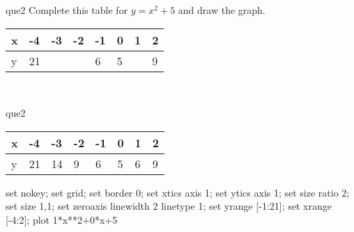 \documentclass[13.5pt, varwidth=true]{beamer}
\begin{document}
\begin{frame}[shrink=19,fragile]
	\begin{beamercolorbox}[rounded=true, left, shadow=true,wd=14.8cm]{que2}
		 Complete this table for $y = x^{2} + 5$ and draw the graph. \\[0.3cm] \renewcommand{\arraystretch}{1.2}\begin{tabular}{|C|C|C|C|C|C|C|C|} \hline x & -4 & -3 & -2 & -1 & 0 & 1 & 2 \\ \hline y & 21 &  &  & 6 & 5 &  & 9\\ \hline \end{tabular}\\[0.3cm]
	\end{beamercolorbox}
\end{frame}
\begin{frame}[shrink=19,fragile]
	\begin{beamercolorbox}[rounded=true, left, shadow=true,wd=14.8cm]{que2}
		\renewcommand{\arraystretch}{1.2}\begin{tabular}{|C|C|C|C|C|C|C|C|} \hline x & -4 & -3 & -2 & -1 & 0 & 1 & 2 \\ \hline y & 21 & 14 & 9 & 6 & 5 & 6 & 9\\ \hline \end{tabular}\begin{gnuplot}[terminal=pdf] set nokey; set grid; set border 0; set xtics axis 1; set ytics axis 1; set size ratio 2; set size 1,1; set zeroaxis linewidth 2 linetype 1; set yrange [-1:21]; set xrange [-4:2]; plot 1*x**2+0*x+5 \end{gnuplot}
	\end{beamercolorbox}
\end{frame}
\end{document}
